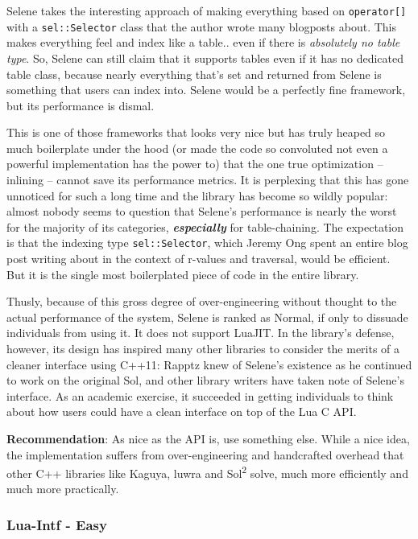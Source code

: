 \documentclass[conference,compsoc]{IEEEtran}
\newcommand{\soltwo}{Sol\textsuperscript{2}}
\begin{document}
Selene takes the interesting approach of making everything based on \lstinline|operator[]| with a \lstinline|sel::Selector| class that the author wrote many blogposts about. This makes everything feel and index like a table.. even if there is \emph{absolutely no table type}. So, Selene can still claim that it supports tables even if it has no dedicated table class, because nearly everything that's set and returned from Selene is something that users can index into. Selene would be a perfectly fine framework, but its performance is dismal.

This is one of those frameworks that looks very nice but has truly heaped so much boilerplate under the hood (or made the code so convoluted not even a powerful implementation has the power to) that the one true optimization -- inlining -- cannot save its performance metrics. It is perplexing that this has gone unnoticed for such a long time and the library has become so wildly popular: almost nobody seems to question that Selene's performance is nearly the worst for the majority of its categories, \emph{\textbf{especially}} for table-chaining. The expectation is that the indexing type \lstinline|sel::Selector|, which Jeremy Ong spent an entire blog post writing about in the context of r-values and traversal, would be efficient. But it is the single most boilerplated piece of code in the entire library.

Thusly, because of this gross degree of over-engineering without thought to the actual performance of the system, Selene is ranked as Normal, if only to dissuade individuals from using it. It does not support LuaJIT. In the library's defense, however, its design has inspired many other libraries to consider the merits of a cleaner interface using C++11: Rapptz knew of Selene's existence as he continued to work on the original Sol, and other library writers have taken note of Selene's interface. As an academic exercise, it succeeded in getting individuals to think about how users could have a clean interface on top of the Lua C API.

\textbf{Recommendation}: As nice as the API is, use something else. While a nice idea, the implementation suffers from over-engineering and handcrafted overhead that other C++ libraries like Kaguya, luwra and \soltwo{} solve, much more efficiently and much more practically.

\subsubsection{Lua-Intf - Easy}\label{sssec:lua-intf}
\end{document}
